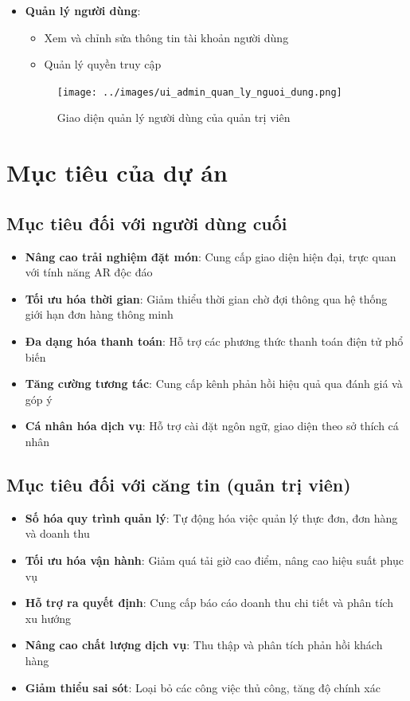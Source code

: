 \documentclass[12pt,a4paper]{article}
\begin{document}
\begin{itemize}[leftmargin=1cm]
    \item \textbf{Quản lý người dùng}:
        \begin{itemize}[leftmargin=0.5cm]
            \item Xem và chỉnh sửa thông tin tài khoản người dùng
            \item Quản lý quyền truy cập
        \end{itemize}
\begin{figure}[H]
    \centering
    \texttt{[image: ../images/ui\_admin\_quan\_ly\_nguoi\_dung.png]} %
    \caption{Giao diện quản lý người dùng của quản trị viên}
    \label{fig:ui_admin_users}
\end{figure}
\end{itemize}

\section{Mục tiêu của dự án}

\subsection{Mục tiêu đối với người dùng cuối}
\begin{itemize}[leftmargin=1cm]
    \item \textbf{Nâng cao trải nghiệm đặt món}: Cung cấp giao diện hiện đại, trực quan với tính năng AR độc đáo
    \item \textbf{Tối ưu hóa thời gian}: Giảm thiểu thời gian chờ đợi thông qua hệ thống giới hạn đơn hàng thông minh
    \item \textbf{Đa dạng hóa thanh toán}: Hỗ trợ các phương thức thanh toán điện tử phổ biến
    \item \textbf{Tăng cường tương tác}: Cung cấp kênh phản hồi hiệu quả qua đánh giá và góp ý
    \item \textbf{Cá nhân hóa dịch vụ}: Hỗ trợ cài đặt ngôn ngữ, giao diện theo sở thích cá nhân
\end{itemize}

\subsection{Mục tiêu đối với căng tin (quản trị viên)}
\begin{itemize}[leftmargin=1cm]
    \item \textbf{Số hóa quy trình quản lý}: Tự động hóa việc quản lý thực đơn, đơn hàng và doanh thu
    \item \textbf{Tối ưu hóa vận hành}: Giảm quá tải giờ cao điểm, nâng cao hiệu suất phục vụ
    \item \textbf{Hỗ trợ ra quyết định}: Cung cấp báo cáo doanh thu chi tiết và phân tích xu hướng
    \item \textbf{Nâng cao chất lượng dịch vụ}: Thu thập và phân tích phản hồi khách hàng
    \item \textbf{Giảm thiểu sai sót}: Loại bỏ các công việc thủ công, tăng độ chính xác
\end{itemize}
\end{document}
